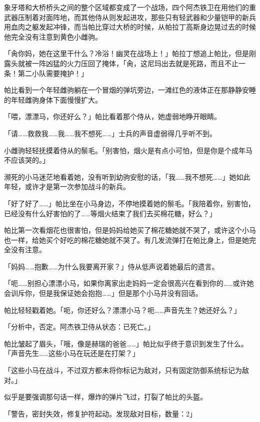 \horizonline


象牙塔和大桥桥头之间的整个区域都变成了一个战场，四个阿杰铁卫在用他们的重武器压制着对面阵地，而其他侍从则发起进攻，那些只有轻武器和少量铠甲的新兵用血肉之躯发起冲锋，而当帕比穿过大桥的时候，从帕拉丁高斯身边晃过去的时候他完全没有注意到黄色小雌驹。

「肏你妈，她在这里干什么？冷浴！幽灵在战场上！」帕拉丁想追上帕比，但是刚露头就被一阵凶猛的火力压回了掩体，「肏，这尼玛出去就是死路，而且不止一条！第二小队需要掩护！」

帕比看到一个年轻雌驹躺在一个冒烟的弹坑旁边，一滩红色的液体正在那静静安睡的年轻雌驹身体下面慢慢扩大。

「喂，漂漂马，你还好么？」帕比看着那个侍从，她虚弱地睁开眼睛。

「请……救救我……我……我不想死……」士兵的声音虚弱得几乎听不到。

小雌驹轻轻抚摸着侍从的鬃毛。「别害怕，烟火是有点小可怕，但是你是个成年马不应该哭的。」

濒死的小马迷茫地看着她，没有听到幼驹安慰的话，「我……我不想死……」她如此年轻，或许才是第一次参加战斗的新兵。

「好了好了……」帕比坐在小马身边，不停地摸着她的鬃毛。「我陪着你，别害怕，已经没有什么好害怕的了……等烟火结束了我们去买棉花糖，好么？」

帕比第一次看烟花也很害怕，但是妈妈给她买了棉花糖她就不哭了，或许这个小马也一样，给她买个好吃的棉花糖她就不哭了。有几发流弹打在帕比身上，但是她完全没有注意。

「妈妈……抱歉……为什么我要离开家？」侍从低声说着她最后的遗言。

「呃……别担心漂漂小马，如果你离家出走妈妈一定会很高兴在看到你的……或许她会训斥你，但是我保证她会抱抱……」但是那个小马并没有回话。

帕比轻轻戳着她。「呃，你还好么？漂漂小马？呃……声音先生？她还好么？」

「{\mt 分析中，否定。阿杰铁卫侍从状态：已死亡。}」

帕比皱起了眉头，「哦，像是赫瑞的爸爸……」帕比似乎终于意识到发生了什么。「声音先生……这些小马在玩还是在打架？」

「{\mt 这些小马在战斗，不过双方都未将你标记为敌对，只有固定防御系统标记为敌对。}」

似乎是要强调那句话一样，爆炸的弹片飞过，打裂了帕比的头盔。

「{\mt 警告，密封失效，修复护符起动。发现敌对目标，数量：2}」

